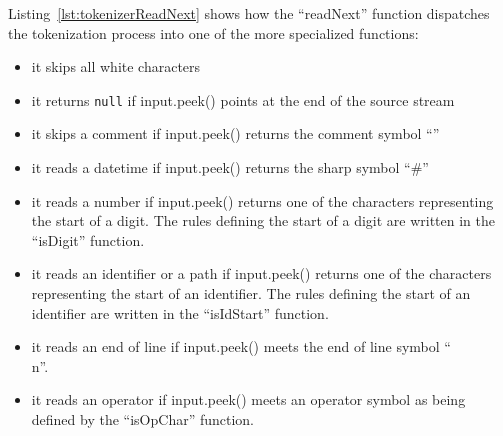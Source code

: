 

Listing~\ref{lst:tokenizerReadNext} shows how the ``readNext'' function dispatches the tokenization process into one of the more specialized functions:
\begin{itemize}
    \item it skips all white characters
    \item it returns \texttt{null} if input.peek() points at the end of the source stream
    \item it skips a comment if input.peek() returns the comment symbol ``\textquotesingle''
    \item it reads a datetime if input.peek() returns the sharp symbol ``\#''
    \item it reads a number if input.peek() returns one of the characters representing the start of a digit. The rules defining the start of a digit are written in the ``isDigit'' function.
    \item it reads an identifier or a path if input.peek() returns one of the characters representing the start of an identifier. The rules defining the start of an identifier are written in the ``isIdStart'' function.
    \item it reads an end of line if input.peek() meets the end of line symbol ``\\n''. 
    \item it reads an operator if input.peek() meets an operator symbol as being defined by the ``isOpChar'' function.
\end{itemize}